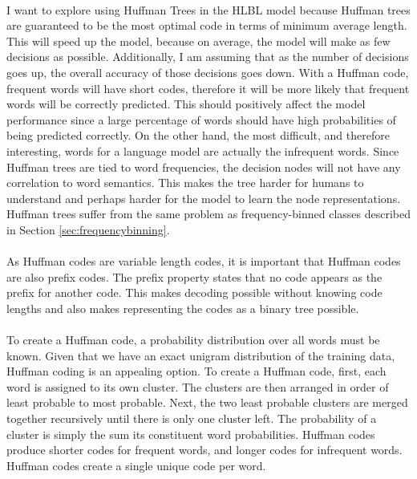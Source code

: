 \paragraph{}
I want to explore using Huffman Trees in the HLBL model because Huffman trees are guaranteed to be the most optimal code in terms of minimum average length. This will speed up the model, because on average, the model will make as few decisions as possible. Additionally, I am assuming that as the number of decisions goes up, the overall accuracy of those decisions goes down. With a Huffman code, frequent words will have short codes, therefore it will be more likely that frequent words will be correctly predicted. This should positively affect the model performance since a large percentage of words should have high probabilities of being predicted correctly. On the other hand, the most difficult, and therefore interesting, words for a language model are actually the infrequent words.  Since Huffman trees are tied to word frequencies, the decision nodes will not have any correlation to word semantics. This makes the tree harder for humans to understand and perhaps harder for the model to learn the node representations.  Huffman trees suffer from the same problem as frequency-binned classes described in Section \ref{sec:frequencybinning}.
\paragraph{}
As Huffman codes are variable length codes, it is important that Huffman codes are also prefix codes. The prefix property states that no code appears as the prefix for another code. This makes decoding possible without knowing code lengths and also makes representing the codes as a binary tree possible. 
\paragraph{}
To create a Huffman code, a probability distribution over all words must be known. Given that we have an exact unigram distribution of the training data, Huffman coding is an appealing option. To create a Huffman code, first, each word is assigned to its own cluster.  The clusters are then arranged in order of least probable to most probable. Next, the two least probable clusters are merged together recursively until there is only one cluster left. The probability of a cluster is simply the sum its constituent word probabilities. Huffman codes produce shorter codes for frequent words, and longer codes for infrequent words. Huffman codes create a single unique code per word.
